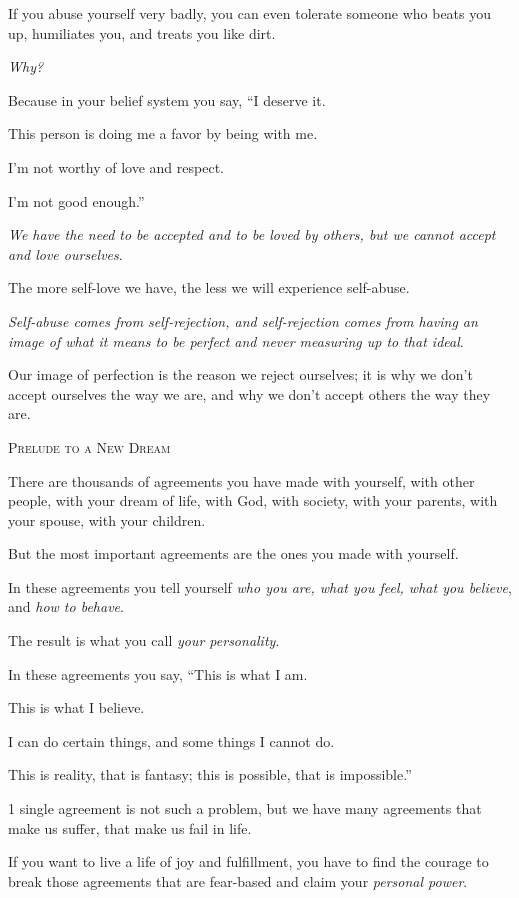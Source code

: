 \documentclass{article}
\numberwithin{equation}{section}
\begin{document}
%
If you abuse yourself very badly, you can even tolerate someone who beats you up, humiliates you, and treats you like dirt.

\textit{Why?}

Because in your belief system you say, ``I deserve it.

This person is doing me a favor by being with me.

I'm not worthy of love and respect.

I'm not good enough.''

%
\textit{We have the need to be accepted and to be loved by others, but we cannot accept and love ourselves}.

The more self-love we have, the less we will experience self-abuse.

\textit{Self-abuse comes from self-rejection, and self-rejection comes from having an image of what it means to be perfect and never measuring up to that ideal}.

Our image of perfection is the reason we reject ourselves; it is why we don't accept ourselves the way we are, and why we don't accept others the way they are.
\begin{center}
    \textsc{Prelude to a New Dream}
\end{center}
There are thousands of agreements you have made with yourself, with other people, with your dream of life, with God, with society, with your parents, with your spouse, with your children.

But the most important agreements are the ones you made with yourself.

In these agreements you tell yourself \textit{who you are, what you feel, what you believe}, and \textit{how to behave}.

The result is what you call \textit{your personality}.

In these agreements you say, ``This is what I am.

This is what I believe.

I can do certain things, and some things I cannot do.

This is reality, that is fantasy; this is possible, that is impossible.''

%
1 single agreement is not such a problem, but we have many agreements that make us suffer, that make us fail in life.

If you want to live a life of joy and fulfillment, you have to find the courage to break those agreements that are fear-based and claim your \textit{personal power}.
\end{document}
